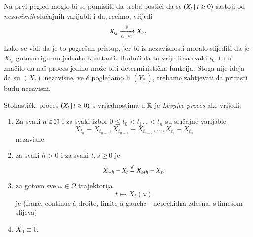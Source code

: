 \begin{nap} \label{nap:21.2}
    Na prvi pogled moglo bi se pomisliti da treba posti\' ci da se $({X_t} \: | \: {t \geq 0})$ sastoji od \emph{nezavisnih} slu\v cajnih varijabli i da, recimo, vrijedi
    \begin{equation*}
        X_{t_n} \xrightarrow[t_n \to t_0]{\mathbb{P}} X_{t_0}.
    \end{equation*}
    Lako se vidi da je to pogre\v san pristup, jer bi iz nezavisnosti moralo slijediti da je $X_{t_0}$ gotovo sigurno jednako konstanti.
    Budu\' ci da to vrijedi za svaki $t_0$, to bi zna\v cilo da na\v s proces jedino mo\v ze biti deterministi\v cka funkcija.
    Stoga nije ideja da su $(X_t)$ nezavisne, ve \' c pogledamo li $(Y_{\frac{m}{n}})$, trebamo zahtjevati da prirasti budu nezavisni.
\end{nap}

\begin{defn}    \label{defn:21.3}
    Stohasti\v cki proces $({X_t} \: | \: {t \geq 0})$ s vrijednostima u $\mathbb{R}$ je \emph{L\' evyjev proces} ako vrijedi:
    \begin{enumerate}[label=(\alph*)]
        \item   \label{defn:21.3.1}
        Za svaki $n \in \mathbb{N}$ i za svaki izbor $0 \leq t_0 < t_1 \ldots < t_n$ su slu\v cajne varijable
        \begin{equation*}
            X_{t_n} - X_{t_{n - 1}}, X_{t_{n - 1}} - X_{t_{n - 2}}, \ldots, X_{t_1} - X_{t_0}
        \end{equation*}
        nezavisne.
        \item   \label{defn:21.3.2}
        za svaki $h > 0$ i za svaki $t, s \geq 0$ je
        \begin{equation*}
            X_{t + h} - X_t \overset{d}{=} X_{s + h} - X_s.
        \end{equation*}
        \item   \label{defn:21.3.3}
        za gotovo sve $\omega \in \Omega$ trajektorija
        \begin{equation*}
            t \mapsto X_t (\omega)
        \end{equation*}
        je \cadlag  \: (franc. continue \' a droite, limite \' a gauche - neprekidna zdesna, s limesom slijeva)
        \item   \label{defn:21.3.4}
        $X_0 \equiv 0$.
    \end{enumerate}
\end{defn}

